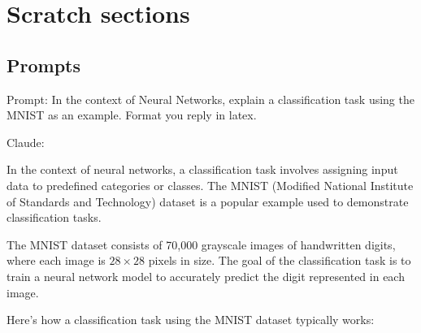 \section{Scratch sections}

\subsection{Prompts}

Prompt: In the context of Neural Networks, explain a classification task using the MNIST as an example. Format you reply in latex.

Claude: 

In the context of neural networks, a classification task involves assigning input data to predefined categories or classes. The MNIST (Modified National Institute of Standards and Technology) dataset is a popular example used to demonstrate classification tasks.

The MNIST dataset consists of 70,000 grayscale images of handwritten digits, where each image is $28 \times 28$ pixels in size. The goal of the classification task is to train a neural network model to accurately predict the digit represented in each image.

Here's how a classification task using the MNIST dataset typically works:

